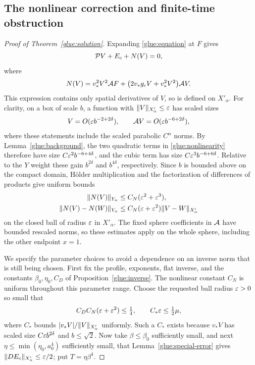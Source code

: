 \subsection{The nonlinear correction and finite-time obstruction}

\begin{proof}[Proof of Theorem~\ref{glue:solution}]
Expanding \eqref{glue:equation} at $F$ gives
\begin{equation}\label{glue:nonlinear-equation}
 \mathcal P V+E_c+N(V)=0,
\end{equation}
where
\begin{equation}\label{glue:nonlinearity}
 N(V)=v_*^2V^2\mathcal A F+
       \bigl(2v_*g_cV+v_*^2V^2\bigr)\mathcal A V.
\end{equation}
This expression contains only spatial derivatives of $V$, so is
defined on $X'_\alpha$.  For clarity, on a box of scale $b$, a
function with $\lVert V\rVert_{X'_\alpha}\le\varepsilon$ has scaled sizes
\[
 V=O(\varepsilon b^{-2+2\delta}),\qquad
 \mathcal A V=O(\varepsilon b^{-6+2\delta}),
\]
where these statements include the scaled parabolic $C^\alpha$
norms.  By Lemma~\ref{glue:background}, the two quadratic terms in
\eqref{glue:nonlinearity} therefore have size
$C\varepsilon^2b^{-6+4\delta}$, and the cubic term has size
$C\varepsilon^3b^{-6+6\delta}$.  Relative to the $Y$ weight these gain
$b^{2\delta}$ and $b^{4\delta}$, respectively.  Since $b$ is bounded
above on the compact domain, H\"older multiplication and the
factorization of differences of products give uniform bounds
\begin{align}
 \lVert N(V)\rVert_{Y_\alpha}&\le C_N(\varepsilon^2+\varepsilon^3),
 \label{glue:nonlinear-size}\\
 \lVert N(V)-N(W)\rVert_{Y_\alpha}
 &\le C_N(\varepsilon+\varepsilon^2)\lVert V-W\rVert_{X'_\alpha}
 \label{glue:nonlinear-lipschitz}
\end{align}
on the closed ball of radius $\varepsilon$ in $X'_\alpha$.  The fixed sphere
coefficients in $\mathcal A$ have bounded rescaled norms, so these estimates
apply on the whole sphere, including the other endpoint $x=1$.

We specify the parameter choices to avoid a dependence on an inverse
norm that is still being chosen.  First fix the profile, exponents,
flat inverse, and the constants $\beta_0,\eta_0,C_D$ of
Proposition~\ref{glue:inverse}.  The nonlinear constant $C_N$ is
uniform throughout this parameter range.  Choose the requested ball
radius $\varepsilon>0$ so small that
\[
 C_D C_N(\varepsilon+\varepsilon^2)\le\tfrac14,\qquad
 C_*\varepsilon\le\tfrac12\mu,
\]
where $C_*$ bounds $\lvert v_*V\rvert/\lVert V\rVert_{X'_\alpha}$ uniformly.
Such a $C_*$ exists because $v_*V$ has scaled size
$C\varepsilon b^{2\delta}$ and $b\le\sqrt2$.
Now take $\beta\le\beta_0$ sufficiently small, and next
$\eta\le\min(\eta_0,a_0^4)$ sufficiently small, that
Lemma~\ref{glue:special-error} gives
$\lVert DE_c\rVert_{X'_\alpha}\le\varepsilon/2$; put $T=\eta\beta^4$.


\end{proof}
